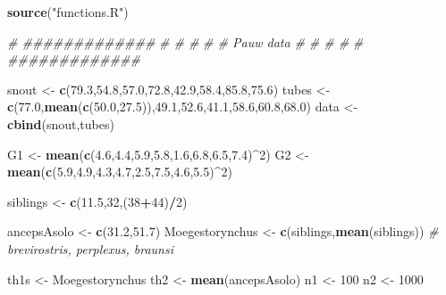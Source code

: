 \documentclass[]{article}
\newenvironment{Shaded}{\begin{snugshade}}{\end{snugshade}}
\newcommand{\CommentTok}[1]{\textcolor[rgb]{0.56,0.35,0.01}{\textit{#1}}}
\newcommand{\DecValTok}[1]{\textcolor[rgb]{0.00,0.00,0.81}{#1}}
\newcommand{\FloatTok}[1]{\textcolor[rgb]{0.00,0.00,0.81}{#1}}
\newcommand{\KeywordTok}[1]{\textcolor[rgb]{0.13,0.29,0.53}{\textbf{#1}}}
\newcommand{\NormalTok}[1]{#1}
\newcommand{\OperatorTok}[1]{\textcolor[rgb]{0.81,0.36,0.00}{\textbf{#1}}}
\newcommand{\StringTok}[1]{\textcolor[rgb]{0.31,0.60,0.02}{#1}}
\begin{document}
\begin{Shaded}
\begin{Highlighting}[]
\KeywordTok{source}\NormalTok{(}\StringTok{"functions.R"}\NormalTok{)}

\CommentTok{#      #############     }
\CommentTok{#      #           #}
\CommentTok{#      # Pauw data #     }
\CommentTok{#      #           #}
\CommentTok{#      #############     }

\NormalTok{snout <-}\StringTok{ }\KeywordTok{c}\NormalTok{(}\FloatTok{79.3}\NormalTok{,}\FloatTok{54.8}\NormalTok{,}\FloatTok{57.0}\NormalTok{,}\FloatTok{72.8}\NormalTok{,}\FloatTok{42.9}\NormalTok{,}\FloatTok{58.4}\NormalTok{,}\FloatTok{85.8}\NormalTok{,}\FloatTok{75.6}\NormalTok{)}
\NormalTok{tubes <-}\StringTok{ }\KeywordTok{c}\NormalTok{(}\FloatTok{77.0}\NormalTok{,}\KeywordTok{mean}\NormalTok{(}\KeywordTok{c}\NormalTok{(}\FloatTok{50.0}\NormalTok{,}\FloatTok{27.5}\NormalTok{)),}\FloatTok{49.1}\NormalTok{,}\FloatTok{52.6}\NormalTok{,}\FloatTok{41.1}\NormalTok{,}\FloatTok{58.6}\NormalTok{,}\FloatTok{60.8}\NormalTok{,}\FloatTok{68.0}\NormalTok{)}
\NormalTok{data <-}\StringTok{ }\KeywordTok{cbind}\NormalTok{(snout,tubes)}

\NormalTok{G1 <-}\StringTok{ }\KeywordTok{mean}\NormalTok{(}\KeywordTok{c}\NormalTok{(}\FloatTok{4.6}\NormalTok{,}\FloatTok{4.4}\NormalTok{,}\FloatTok{5.9}\NormalTok{,}\FloatTok{5.8}\NormalTok{,}\FloatTok{1.6}\NormalTok{,}\FloatTok{6.8}\NormalTok{,}\FloatTok{6.5}\NormalTok{,}\FloatTok{7.4}\NormalTok{)}\OperatorTok{^}\DecValTok{2}\NormalTok{)}
\NormalTok{G2 <-}\StringTok{ }\KeywordTok{mean}\NormalTok{(}\KeywordTok{c}\NormalTok{(}\FloatTok{5.9}\NormalTok{,}\FloatTok{4.9}\NormalTok{,}\FloatTok{4.3}\NormalTok{,}\FloatTok{4.7}\NormalTok{,}\FloatTok{2.5}\NormalTok{,}\FloatTok{7.5}\NormalTok{,}\FloatTok{4.6}\NormalTok{,}\FloatTok{5.5}\NormalTok{)}\OperatorTok{^}\DecValTok{2}\NormalTok{)}

\NormalTok{siblings <-}\StringTok{ }\KeywordTok{c}\NormalTok{(}\FloatTok{11.5}\NormalTok{,}\DecValTok{32}\NormalTok{,(}\DecValTok{38}\OperatorTok{+}\DecValTok{44}\NormalTok{)}\OperatorTok{/}\DecValTok{2}\NormalTok{)}

\NormalTok{ancepsAsolo <-}\StringTok{ }\KeywordTok{c}\NormalTok{(}\FloatTok{31.2}\NormalTok{,}\FloatTok{51.7}\NormalTok{)}
\NormalTok{Moegestorynchus <-}\StringTok{ }\KeywordTok{c}\NormalTok{(siblings,}\KeywordTok{mean}\NormalTok{(siblings)) }\CommentTok{# brevirostris, perplexus, braunsi}

\NormalTok{th1s <-}\StringTok{ }\NormalTok{Moegestorynchus}
\NormalTok{th2 <-}\StringTok{ }\KeywordTok{mean}\NormalTok{(ancepsAsolo)}
\NormalTok{n1 <-}\StringTok{ }\DecValTok{100}
\NormalTok{n2 <-}\StringTok{ }\DecValTok{1000}


\end{Highlighting}
\end{Shaded}
\end{document}
